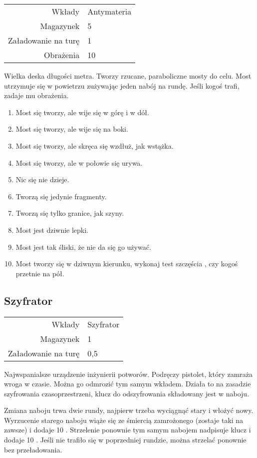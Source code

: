 \begin{tabular}{rl}
Wkłady & Antymateria \\
Magazynek & 5 \\
Załadowanie na turę & 1 \\
Obrażenia & 10 \\
\end{tabular}

Wielka deska długości metra.
Tworzy rzucane, paraboliczne mosty do celu.
Most utrzymuje się w powietrzu zużywając jeden nabój na rundę.
Jeśli kogoś trafi, zadaje mu obrażenia.
\begin{enumerate}
	\item Most się tworzy, ale wije się w górę i w dół.
	\item Most się tworzy, ale wije się na boki.
	\item Most się tworzy, ale skręca się wzdłuż, jak wstążka.
	\item Most się tworzy, ale w połowie się urywa.
	\item Nic się nie dzieje.
	\item Tworzą się jedynie fragmenty.
	\item Tworzą się tylko granice, jak szyny. 
	\item Most jest dziwnie lepki.
	\item Most jest tak śliski, że nie da się go używać.
	\item Most tworzy się w dziwnym kierunku, wykonaj test szczęścia \aba{}, czy kogoś przetnie na pół.
\end{enumerate}

\subsection{Szyfrator \abt{}}

\begin{tabular}{rl}
Wkłady & Szyfrator \\
Magazynek & 1 \\
Załadowanie na turę & 0,5 \\
\end{tabular}

Najwspanialsze urządzenie inżynierii potworów.
Podręczy pistolet, który zamraża wroga w czasie.
Można go odmrozić tym samym wkładem.
Działa to na zasadzie szyfrowania czasoprzestrzeni, klucz do odszyfrowania składowany jest w naboju.

Zmiana naboju trwa dwie rundy, najpierw trzeba wyciągnąć stary i włożyć nowy.
Wyrzucenie starego naboju wiąże się ze śmiercią zamrożonego (zostaje taki na zawsze) i dodaje 10 \abgrz{}.
Strzelenie ponownie tym samym nabojem nadpisuje klucz i dodaje 10 \abgrz{}.
Jeśli nie trafiło się w poprzedniej rundzie, można strzelać ponownie bez przeładowania.

